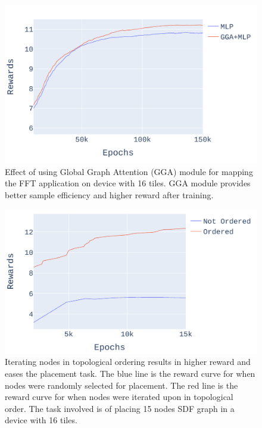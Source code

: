 \begin{figure}[tb]
  \centering
  \includegraphics[width=\linewidth]{fig/plot_gnn_atten_ppo.pdf}
  \caption{Effect of using Global Graph Attention (GGA) module for mapping the FFT application on device with 16 tiles. 
  GGA module provides better sample efficiency and higher reward after training. }
  \label{fig:ifft_rewards}
\end{figure}

\begin{figure}[tb]
  \centering
  \includegraphics[width=\linewidth]{fig/plot_ordered.pdf}
  \caption{Iterating nodes in topological ordering results in higher reward and eases the placement task. 
 The blue line is the reward curve for when nodes were randomly selected for placement. The red line is the reward curve for when nodes were iterated upon in topological order. The task involved is of placing 15 nodes SDF graph in a device with 16 tiles.}
  \label{fig:ordered_placement}
\end{figure}

